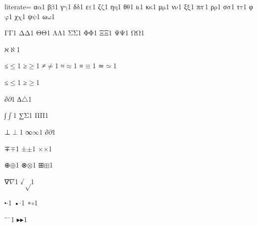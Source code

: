 {%
literate=
    {α}{{\ensuremath{\mathrm{\alpha}}}}1
{β}{{\ensuremath{\mathrm{\beta}}}}1
{γ}{{\ensuremath{\mathrm{\gamma}}}}1
{δ}{{\ensuremath{\mathrm{\delta}}}}1
{ε}{{\ensuremath{\mathrm{\varepsilon}}}}1
{ζ}{{\ensuremath{\mathrm{\zeta}}}}1
{η}{{\ensuremath{\mathrm{\eta}}}}1
{θ}{{\ensuremath{\mathrm{\theta}}}}1
{ι}{{\ensuremath{\mathrm{\iota}}}}1
{κ}{{\ensuremath{\mathrm{\kappa}}}}1
{μ}{{\ensuremath{\mathrm{\mu}}}}1
{ν}{{\ensuremath{\mathrm{\nu}}}}1
{ξ}{{\ensuremath{\mathrm{\xi}}}}1
{π}{{\ensuremath{\mathrm{\mathnormal{\pi}}}}}1
{ρ}{{\ensuremath{\mathrm{\rho}}}}1
{σ}{{\ensuremath{\mathrm{\sigma}}}}1
{τ}{{\ensuremath{\mathrm{\tau}}}}1
{φ}{{\ensuremath{\mathrm{\varphi}}}}1
{χ}{{\ensuremath{\mathrm{\chi}}}}1
{ψ}{{\ensuremath{\mathrm{\psi}}}}1
{ω}{{\ensuremath{\mathrm{\omega}}}}1

{Γ}{{\ensuremath{\mathrm{\Gamma}}}}1
{Δ}{{\ensuremath{\mathrm{\Delta}}}}1
{Θ}{{\ensuremath{\mathrm{\Theta}}}}1
{Λ}{{\ensuremath{\mathrm{\Lambda}}}}1
{Σ}{{\ensuremath{\mathrm{\Sigma}}}}1
{Φ}{{\ensuremath{\mathrm{\Phi}}}}1
{Ξ}{{\ensuremath{\mathrm{\Xi}}}}1
{Ψ}{{\ensuremath{\mathrm{\Psi}}}}1
{Ω}{{\ensuremath{\mathrm{\Omega}}}}1

{ℵ}{{\ensuremath{\aleph}}}1

{≤}{{\ensuremath{\leq}}}1
{≥}{{\ensuremath{\geq}}}1
{≠}{{\ensuremath{\neq}}}1
{≈}{{\ensuremath{\approx}}}1
{≡}{{\ensuremath{\equiv}}}1
{≃}{{\ensuremath{\simeq}}}1

{≤}{{\ensuremath{\leq}}}1
{≥}{{\ensuremath{\geq}}}1

{∂}{{\ensuremath{\partial}}}1
{∆}{{\ensuremath{\triangle}}}1 %

{∫}{{\ensuremath{\int}}}1
{∑}{{\ensuremath{\mathrm{\Sigma}}}}1
{Π}{{\ensuremath{\mathrm{\Pi}}}}1

{⊥}{{\ensuremath{\perp}}}1
{∞}{{\ensuremath{\infty}}}1
{∂}{{\ensuremath{\partial}}}1

{∓}{{\ensuremath{\mp}}}1
{±}{{\ensuremath{\pm}}}1
{×}{{\ensuremath{\times}}}1

{⊕}{{\ensuremath{\oplus}}}1
{⊗}{{\ensuremath{\otimes}}}1
{⊞}{{\ensuremath{\boxplus}}}1

{∇}{{\ensuremath{\nabla}}}1
{√}{{\ensuremath{\sqrt}}}1

{⬝}{{\ensuremath{\cdot}}}1
{•}{{\ensuremath{\cdot}}}1
{∘}{{\ensuremath{\circ}}}1

{⁻}{{\ensuremath{^{-}}}}1
{▸}{{\ensuremath{\blacktriangleright}}}1

}
